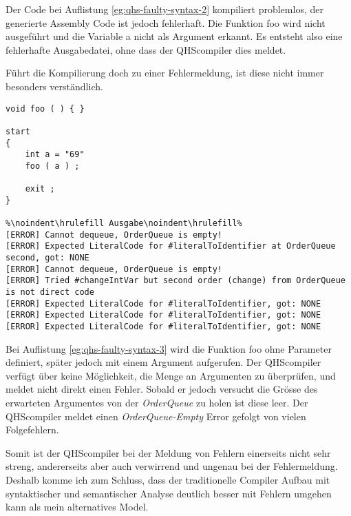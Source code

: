 Der Code bei Auflistung \ref{eg:qhs-faulty-syntax-2} kompiliert problemlos, der generierte Assembly Code ist jedoch fehlerhaft. Die Funktion foo wird nicht ausgeführt und die Variable a nicht als Argument erkannt.
Es entsteht also eine fehlerhafte Ausgabedatei, ohne dass der QHScompiler dies meldet.

Führt die Kompilierung doch zu einer Fehlermeldung, ist diese nicht immer besonders verständlich.

\begin{lstlisting}[language=QHS, caption=QHS mit falscher Anzahl Argumente, label=eg:qhs-faulty-syntax-3]
void foo ( ) { }

start
{
    int a = "69" 
    foo ( a ) ;

    exit ;
}

%\noindent\hrulefill Ausgabe\noindent\hrulefill%
[ERROR] Cannot dequeue, OrderQueue is empty!
[ERROR] Expected LiteralCode for #literalToIdentifier at OrderQueue second, got: NONE
[ERROR] Cannot dequeue, OrderQueue is empty!
[ERROR] Tried #changeIntVar but second order (change) from OrderQueue is not direct code
[ERROR] Expected LiteralCode for #literalToIdentifier, got: NONE
[ERROR] Expected LiteralCode for #literalToIdentifier, got: NONE
[ERROR] Expected LiteralCode for #literalToIdentifier, got: NONE
\end{lstlisting}

Bei Auflistung \ref{eg:qhs-faulty-syntax-3} wird die Funktion foo ohne Parameter definiert, später jedoch mit einem Argument aufgerufen.
Der QHScompiler verfügt über keine Möglichkeit, die Menge an Argumenten zu überprüfen, und meldet nicht direkt einen Fehler. 
Sobald er jedoch versucht die Grösse des erwarteten Argumentes von der \textit{OrderQueue} zu holen ist diese leer.
Der QHScompiler meldet einen \textit{OrderQueue-Empty} Error gefolgt von vielen Folgefehlern.


Somit ist der QHScompiler bei der Meldung von Fehlern einerseits nicht sehr streng, andererseits aber auch verwirrend und ungenau bei der Fehlermeldung.
Deshalb komme ich zum Schluss, dass der traditionelle Compiler Aufbau mit syntaktischer und semantischer Analyse deutlich besser mit Fehlern umgehen kann als mein alternatives Model.

